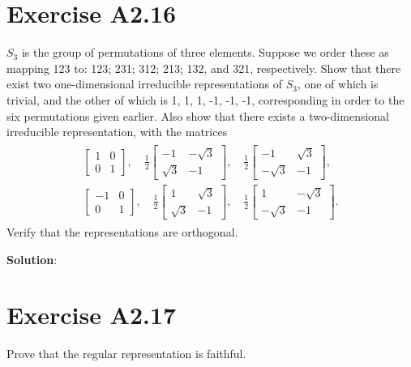 \documentclass{book}
\begin{document}
\section*{Exercise A2.16}
    $S_3$ is the group of permutations of three elements. Suppose we order these as mapping 123 to: 123; 231; 312; 213; 132, and 321, respectively. Show that there exist two one-dimensional irreducible representations of $S_3$, one of which is trivial, and the other of which is 1, 1, 1, -1, -1, -1, corresponding in order to the six permutations given earlier. Also show that there exists a two-dimensional irreducible representation, with the matrices
    \begin{align}
    \begin{aligned}
        \begin{bmatrix}
            1 & 0 \\
            0 & 1
        \end{bmatrix}, \quad
        \frac{1}{2}
        \begin{bmatrix}
            -1 & -\sqrt{3} \\
            \sqrt{3} & -1
        \end{bmatrix}, \quad
        \frac{1}{2}
        \begin{bmatrix}
            -1 & \sqrt{3} \\
            -\sqrt{3} & -1
        \end{bmatrix}, \\
        \begin{bmatrix}
            -1 & 0 \\
            0 & 1
        \end{bmatrix}, \quad
        \frac{1}{2}
        \begin{bmatrix}
            1 & \sqrt{3} \\
            \sqrt{3} & -1
        \end{bmatrix}, \quad
        \frac{1}{2}
        \begin{bmatrix}
            1 & -\sqrt{3} \\
            -\sqrt{3} & -1
        \end{bmatrix}.
    \end{aligned}
    \end{align}
    Verify that the representations are orthogonal.
    
    \textbf{Solution}:

\section*{Exercise A2.17}
    Prove that the regular representation is faithful.
    
\end{document}
